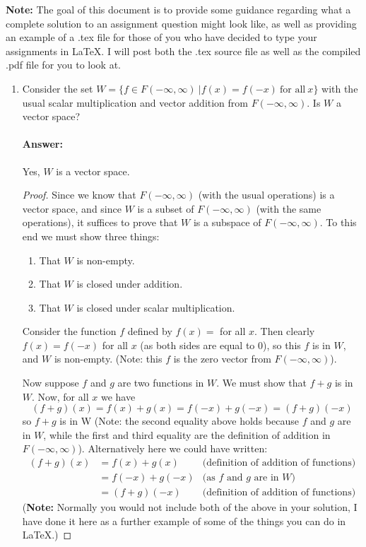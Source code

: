 \documentclass[12pt]{article}
\begin{document}
{\bf Note:} The goal of this document is to provide some guidance regarding what a complete solution to an assignment question might look like, as well as providing an example of a .tex file for those of you who have decided to type your assignments in \LaTeX. I will post both the .tex source file as well as the compiled .pdf file for you to look at.
\begin{enumerate}
        \item Consider the set $W = \{f \in F(-\infty, \infty) \ | f(x) = f(-x) \ \textrm{for all} \ x \}$ with the usual scalar multiplication and vector addition from $F(-\infty, \infty)$. Is $W$ a vector space?
              \paragraph{Answer:} Yes, $W$ is a vector space.
              \begin{proof}
                      Since we know that $F(-\infty, \infty)$ (with the usual operations) is a vector space, and since $W$ is a subset of $F(-\infty, \infty)$ (with the same operations), it suffices to prove that $W$ is a subspace of $F(-\infty, \infty)$. To this end we must show three things:
                      \begin{enumerate}
                              \item That $W$ is non-empty.
                              \item That $W$ is closed under addition.
                              \item That $W$ is closed under scalar multiplication.
                      \end{enumerate}
                      Consider the function $f$ defined by $f(x) = $ for all $x$. Then clearly $f(x) = f(-x)$ for all $x$ (as both sides are equal to 0), so this $f$ is in $W$, and $W$ is non-empty. (Note: this $f$ is the zero vector from $F(-\infty, \infty)$).

                      Now suppose $f$ and $g$ are two functions in $W$. We must show that $f+g$ is in $W$. Now, for all $x$ we have
                      $$
                              (f+g)(x) = f(x) + g(x) = f(-x) + g(-x) = (f+g)(-x)
                      $$
                      so $f+g$ is in W (Note: the second equality above holds because $f$ and $g$ are in $W$, while the first and third equality are the definition of addition in $F(-\infty, \infty)$).
                      Alternatively here we could have written:
                      \begin{align*}
                              (f+g)(x) & = f(x) + g(x)   & \textrm{(definition of addition of functions)} \\
                                       & = f(-x) + g(-x) & \textrm{(as $f$ and $g$ are in $W$)}           \\
                                       & = (f+g)(-x)     & \textrm{(definition of addition of functions)}
                      \end{align*}
                      ({\bf Note:} Normally you would not include both of the above in your solution, I have done it here as a further example of some of the things you can do in \LaTeX.)


\end{proof}
\end{enumerate}
\end{document}
